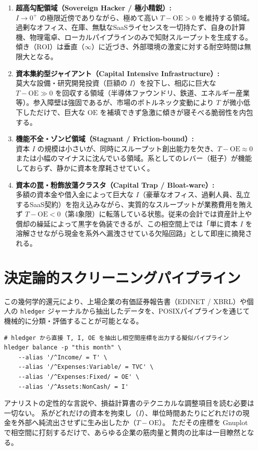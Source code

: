 \begin{enumerate}
    \item \textbf{超高勾配領域（Sovereign Hacker / 極小精鋭）:}\\
    \(I \to 0^+\) の極限近傍でありながら、極めて高い \(T - \mathrm{OE} > 0\) を維持する領域。過剰なオフィス、在庫、無駄なSaaSライセンスを一切持たず、自身の計算機、物理電卓、ローカルパイプラインのみで知財スループットを生成する。傾き（\(\mathrm{ROI}\)）は垂直（\(\infty\)）に近づき、外部環境の激変に対する耐空時間は無限大となる。

    \item \textbf{資本集約型ジャイアント（Capital Intensive Infrastructure）:}\\
    莫大な設備・研究開発投資（巨額の \(I\)）を投下し、相応に巨大な \(T - \mathrm{OE} \gg 0\) を回収する領域（半導体ファウンドリ、鉄道、エネルギー産業等）。参入障壁は強固であるが、市場のボトルネック変動により \(T\) が微小低下しただけで、巨大な \(\mathrm{OE}\) を補填できず急激に傾きが寝そべる脆弱性を内包する。

    \item \textbf{機能不全・ゾンビ領域（Stagnant / Friction-bound）:}\\
    資本 \(I\) の規模は小さいが、同時にスループット創出能力を欠き、\(T - \mathrm{OE} \approx 0\) または小幅のマイナスに沈んでいる領域。系としてのレバー（梃子）が機能しておらず、静かに資本を摩耗させていく。

    \item \textbf{資本の罠・粉飾放蕩クラスタ（Capital Trap / Bloat-ware）:}\\
    多額の資本金や借入金によって巨大な \(I\)（豪華なオフィス、過剰人員、乱立するSaaS契約）を抱え込みながら、実質的なスループットが業務費用を賄えず \(T - \mathrm{OE} < 0\)（第4象限）に転落している状態。従来の会計では資産計上や償却の繰延によって黒字を偽装できるが、この相空間上では「単に資本 \(I\) を溶解させながら現金を系外へ漏洩させている欠陥回路」として即座に摘発される。
\end{enumerate}

\section{決定論的スクリーニングパイプライン}

この幾何学的還元により、上場企業の有価証券報告書（EDINET / XBRL）や個人の \texttt{hledger} ジャーナルから抽出したデータを、POSIXパイプラインを通じて機械的に分類・評価することが可能となる。

\begin{verbatim}
# hledger から直接 T, I, OE を抽出し相空間座標を出力する擬似パイプライン
hledger balance -p "this month" \
    --alias '/^Income/ = T' \
    --alias '/^Expenses:Variable/ = TVC' \
    --alias '/^Expenses:Fixed/ = OE' \
    --alias '/^Assets:NonCash/ = I'
\end{verbatim}

アナリストの定性的な言説や、損益計算書のテクニカルな調整項目を読む必要は一切ない。
系がどれだけの資本を拘束し（\(I\)）、単位時間あたりにどれだけの現金を外部へ純流出させずに生み出したか（\(T - \mathrm{OE}\)）。
ただその座標を Gnuplot で相空間に打刻するだけで、あらゆる企業の筋肉量と贅肉の比率は一目瞭然となる。
